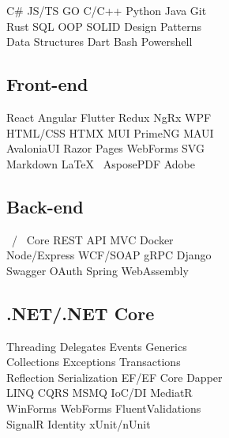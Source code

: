 \documentclass[letterpaper]{cv_12} %
\begin{document}
\begin{newpage}
\begin{minipage}[t]{0.39\textwidth}
    C\# \textbullet{} JS/TS \textbullet{} GO \textbullet{} C/C++
    \textbullet{} Python \textbullet{} Java \textbullet{} Git\\
    Rust \textbullet{} SQL \textbullet{} OOP \textbullet{} SOLID
    \textbullet{} Design Patterns\\
    Data Structures \textbullet{} Dart \textbullet{} Bash 
    \textbullet{} Powershell

    \sectionspace%

    \subsection{Front-end}

    React \textbullet{} Angular \textbullet{} Flutter \textbullet{} Redux
    \textbullet{} NgRx \textbullet{} WPF\\
    HTML/CSS \textbullet{} HTMX \textbullet{} MUI \textbullet{} PrimeNG
    \textbullet{} MAUI\\
    AvaloniaUI \textbullet{} Razor Pages \textbullet{} WebForms
    \textbullet{} SVG\\
    Markdown \textbullet{} \LaTeX\ \textbullet{} AsposePDF \textbullet{}
    Adobe

    \sectionspace%

    \subsection{Back-end}

    \dotnet\ / \dotnet\ Core \textbullet{} REST API \textbullet{} MVC
    \textbullet{} Docker\\
    Node/Express \textbullet{} WCF/SOAP \textbullet{} gRPC \textbullet{}
    Django\\
    Swagger \textbullet{} OAuth \textbullet{} Spring \textbullet{}
    WebAssembly

    \sectionspace%

    \subsection{.NET/.NET Core}

    Threading \textbullet{} Delegates \textbullet{} Events \textbullet{}
    Generics\\
    Collections \textbullet{} Exceptions \textbullet{} Transactions\\
    Reflection \textbullet{} Serialization \textbullet{} EF/EF Core
    \textbullet{} Dapper\\
    LINQ \textbullet{} CQRS \textbullet{} MSMQ \textbullet{} IoC/DI
    \textbullet{} MediatR\\
    WinForms \textbullet{} WebForms \textbullet{} FluentValidations\\
    SignalR \textbullet{} Identity \textbullet{} xUnit/nUnit


\end{minipage}
\end{newpage}
\end{document}
